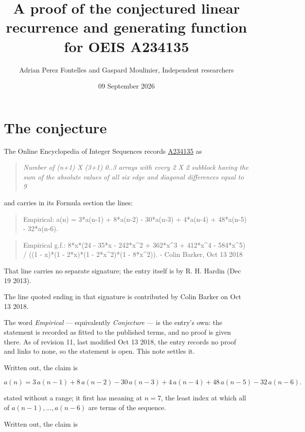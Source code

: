 \documentclass[11pt]{article}
\title{A proof of the conjectured linear recurrence and generating function for OEIS A234135}
\author{Adrian Perez Fontelles and Gaspard Moulinier, Independent researchers}
\date{09 September 2026}
\theoremstyle{definition}
\begin{document}
\maketitle
\section{The conjecture}

The Online Encyclopedia of Integer Sequences records \href{https://oeis.org/A234135}{A234135} as

\begin{quote}\itshape Number of (n+1) X (3+1) 0..3 arrays with every 2 X 2 subblock having the sum of the absolute values of all six edge and diagonal differences equal to 9\end{quote}

and carries in its Formula section the lines:

\begin{quote}\ttfamily Empirical: a(n) = 3*a(n-1) + 8*a(n-2) - 30*a(n-3) + 4*a(n-4) + 48*a(n-5) - 32*a(n-6).\end{quote}

\begin{quote}\ttfamily Empirical g.f.: 8*x*(24 - 35*x - 242*x\textasciicircum{}2 + 362*x\textasciicircum{}3 + 412*x\textasciicircum{}4 - 584*x\textasciicircum{}5) / ((1 - x)*(1 - 2*x)*(1 - 2*x\textasciicircum{}2)*(1 - 8*x\textasciicircum{}2)). - Colin Barker, Oct 13 2018\end{quote}

That line carries no separate signature; the entry itself is by R. H. Hardin (Dec 19 2013).

The line quoted ending in that signature is contributed by Colin Barker on Oct 13 2018.

The word {\itshape Empirical} --- equivalently {\itshape Conjecture} --- is the entry's own: the statement is recorded as fitted to the published terms, and no proof is given there. As of revision 11, last modified Oct 13 2018, the entry records no proof and links to none, so the statement is open. This note settles it.

Written out, the claim is

\[a(n) = 3\,a(n-1) + 8\,a(n-2) - 30\,a(n-3) + 4\,a(n-4) + 48\,a(n-5) - 32\,a(n-6).\]

stated without a range; it first has meaning at $n = 7$, the least index at which all of $a(n-1),\dots,a(n-6)$ are terms of the sequence.

Written out, the claim is
\end{document}
